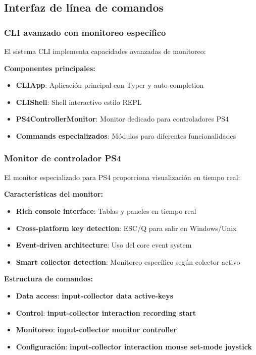 \subsection{Interfaz de línea de comandos}
\label{subsec:cli_input_collector}

\subsubsection{CLI avanzado con monitoreo específico}

El sistema CLI implementa capacidades avanzadas de monitoreo:

\textbf{Componentes principales:}
\begin{itemize}
    \item \textbf{CLIApp}: Aplicación principal con Typer y auto-completion
    \item \textbf{CLIShell}: Shell interactivo estilo REPL
    \item \textbf{PS4ControllerMonitor}: Monitor dedicado para controladores PS4
    \item \textbf{Commands especializados}: Módulos para diferentes funcionalidades
\end{itemize}

\subsubsection{Monitor de controlador PS4}

El monitor especializado para PS4 proporciona visualización en tiempo real:

\textbf{Características del monitor:}
\begin{itemize}
    \item \textbf{Rich console interface}: Tablas y paneles en tiempo real
    \item \textbf{Cross-platform key detection}: ESC/Q para salir en Windows/Unix
    \item \textbf{Event-driven architecture}: Uso del core event system
    \item \textbf{Smart collector detection}: Monitoreo específico según colector activo
\end{itemize}

\textbf{Estructura de comandos:}
\begin{itemize}
    \item \textbf{Data access}: \textbf{input-collector data active-keys}
    \item \textbf{Control}: \textbf{input-collector interaction recording start}
    \item \textbf{Monitoreo}: \textbf{input-collector monitor controller}
    \item \textbf{Configuración}: \textbf{input-collector interaction mouse set-mode joystick}
\end{itemize}

